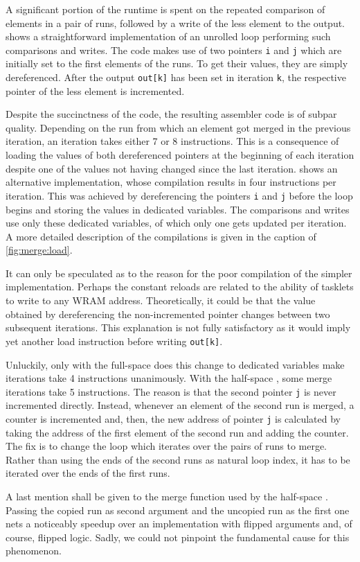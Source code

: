\noindent
A significant portion of the runtime is spent on the repeated comparison of elements in a pair of runs, followed by a write of the less element to the output.
 shows a straightforward implementation of an unrolled loop performing such comparisons and writes.
The code makes use of two pointers \lstinline|i| and \lstinline|j| which are initially set to the first elements of the runs.
To get their values, they are simply dereferenced.
After the output \lstinline|out[k]| has been set in iteration \lstinline|k|, the respective pointer of the less element is incremented.

Despite the succinctness of the \langC{} code, the resulting assembler code is of subpar quality.
Depending on the run from which an element got merged in the previous iteration, an iteration takes either 7 or 8 instructions.
This is a consequence of loading the values of both dereferenced pointers at the beginning of each iteration despite one of the values not having changed since the last iteration.
 shows an alternative implementation, whose compilation results in four instructions per iteration.
This was achieved by dereferencing the pointers \lstinline|i| and \lstinline|j| before the loop begins and storing the values in dedicated variables.
The comparisons and writes use only these dedicated variables, of which only one gets updated per iteration.
A more detailed description of the compilations is given in the caption of \cref{fig:merge:load}.

It can only be speculated as to the reason for the poor compilation of the simpler implementation.
Perhaps the constant reloads are related to the ability of tasklets to write to any \ac{WRAM} address.
Theoretically, it could be that the value obtained by dereferencing the non-incremented pointer changes between two subsequent iterations.
This explanation is not fully satisfactory as it would imply yet another load instruction before writing \lstinline|out[k]|.

Unluckily, only with the full-space \MS{} does this change to dedicated variables make iterations take 4 instructions unanimously.
With the half-space \MS{}, some merge iterations take 5 instructions.
The reason is that the second pointer \lstinline|j| is never incremented directly.
Instead, whenever an element of the second run is merged, a counter is incremented and, then, the new address of pointer \lstinline|j| is calculated by taking the address of the first element of the second run and adding the counter.
The fix is to change the loop which iterates over the pairs of runs to merge.
Rather than using the ends of the second runs as natural loop index, it has to be iterated over the ends of the first runs.

A last mention shall be given to the merge function used by the half-space \MS{}.
Passing the copied run as second argument and the uncopied run as the first one nets a noticeably speedup over an implementation with flipped arguments and, of course, flipped logic.
Sadly, we could not pinpoint the fundamental cause for this phenomenon.
